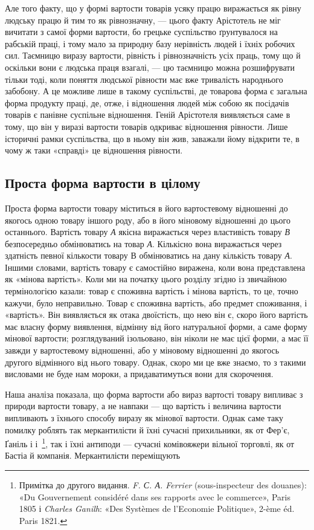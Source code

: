 Але того факту, що у формі вартости товарів усяку працю виражається
як рівну людську працю й тим то як рівнозначну, —
цього факту Арістотель не міг вичитати з самої форми вартости,
бо грецьке суспільство ґрунтувалося на рабській праці, і тому
мало за природну базу нерівність людей і їхніх робочих сил.
Таємницю виразу вартости, рівність і рівнозначність усіх праць,
тому що й оскільки вони є людська праця взагалі, — цю таємницю
можна розшифрувати тільки тоді, коли поняття людської рівности
має вже тривалість народнього забобону. А це можливе лише в
такому суспільстві, де товарова форма є загальна форма продукту
праці, де, отже, і відношення людей між собою як посідачів товарів
є панівне суспільне відношення. Геній Арістотеля виявляється
саме в тому, що він у виразі вартости товарів одкриває відношення
рівности. Лише історичні рамки суспільства, що в ньому він жив,
заважали йому відкрити те, в чому ж таки «справді» це відношення
рівности.

\subsection{Проста форма вартости в цілому}

Проста форма вартости товару міститься в його вартостевому
відношенні до якогось одною товару іншого роду, або в його міновому
відношенні до цього останнього. Вартість товару \emph{А} якісна
виражається через властивість товару \emph{В} безпосередньо обмінюватись
на товар \emph{А}. Кількісно вона виражається через здатність
певної кількости товару В обмінюватись на дану кількість товару
\emph{А}. Іншими словами, вартість товару є самостійно виражена, коли
вона представлена як «мінова вартість». Коли ми на початку цього
розділу згідно із звичайною термінологією казали: товар є споживна
вартість і мінова вартість, то це, точно кажучи, було неправильно.
Товар є споживна вартість, або предмет споживання, і
«вартість». Він виявляється як отака двоїстість, що нею він є,
скоро його вартість має власну форму виявлення, відмінну від
його натуральної форми, а саме форму мінової вартости; розглядуваний
ізольовано, він ніколи не має цієї форми, а має її завжди
у вартостевому відношенні, або у міновому відношенні до якогось
другого відмінного від нього товару. Однак, скоро ми це вже
знаємо, то з такими висловами не буде нам мороки, а придаватимуться
вони для скорочення.

Наша аналіза показала, що форма вартости або вираз вартості
товару випливає з природи вартости товару, а не навпаки — що
вартість і величина вартости випливають з їхнього способу виразу
як мінової вартости. Однак саме таку помилку роблять так меркантилісти
й їхні сучасні прихильники, як от Фер’є, Ґаніль і
і~\footnote{
Примітка до другого видання. \emph{F. С. А. Ferrier} (sous-inspecteur
des douanes): «Du Gouvernement considéré dans ses rapports avec
le commerce», Paris 1805 і \emph{Charles Ganilh}: «Des Systèmes de l’Economie
Politique», 2-ème éd. Paris 1821.
}, так і їхні антиподи — сучасні комівояжери вільної торговлі,
як от Бастіа й компанія. Меркантилісти переміщують
\parbreak{}  %
